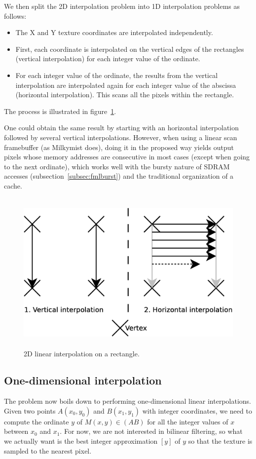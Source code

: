 \documentclass[a4paper,11pt]{kthesis}
\begin{document}
We then split the 2D interpolation problem into 1D interpolation problems as follows:
\begin{itemize}
\item The X and Y texture coordinates are interpolated independently.
\item First, each coordinate is interpolated on the vertical edges of the rectangles (vertical interpolation) for each integer value of the ordinate.
\item For each integer value of the ordinate, the results from the vertical interpolation are interpolated again for each integer value of the abscissa (horizontal interpolation). This scans all the pixels within the rectangle.
\end{itemize}
The process is illustrated in figure~\ref{fig:rectinter}.

One could obtain the same result by starting with an horizontal interpolation followed by several vertical interpolations. However, when using a linear scan framebuffer (as Milkymist does), doing it in the proposed way yields output pixels whose memory addresses are consecutive in most cases (except when going to the next ordinate), which works well with the bursty nature of SDRAM accesses (subsection~\ref{subsec:fmlburst}) and the traditional organization of a cache.

\begin{figure}[htp]
\centering
\includegraphics[height=80mm]{rectinter.eps}
\caption{2D linear interpolation on a rectangle.}
\label{fig:rectinter}
\end{figure}

\subsection{One-dimensional interpolation}
The problem now boils down to performing one-dimensional linear interpolations. Given two points $A(x_{0}, y_{0})$ and $B(x_{1}, y_{1})$ with integer coordinates, we need to compute the ordinate $y$ of $M(x, y) \in (AB)$ for all the integer values of $x$ between $x_{0}$ and $x_{1}$. For now, we are not interested in bilinear filtering, so what we actually want is the best integer approximation $[y]$ of $y$ so that the texture is sampled to the nearest pixel.
\end{document}
